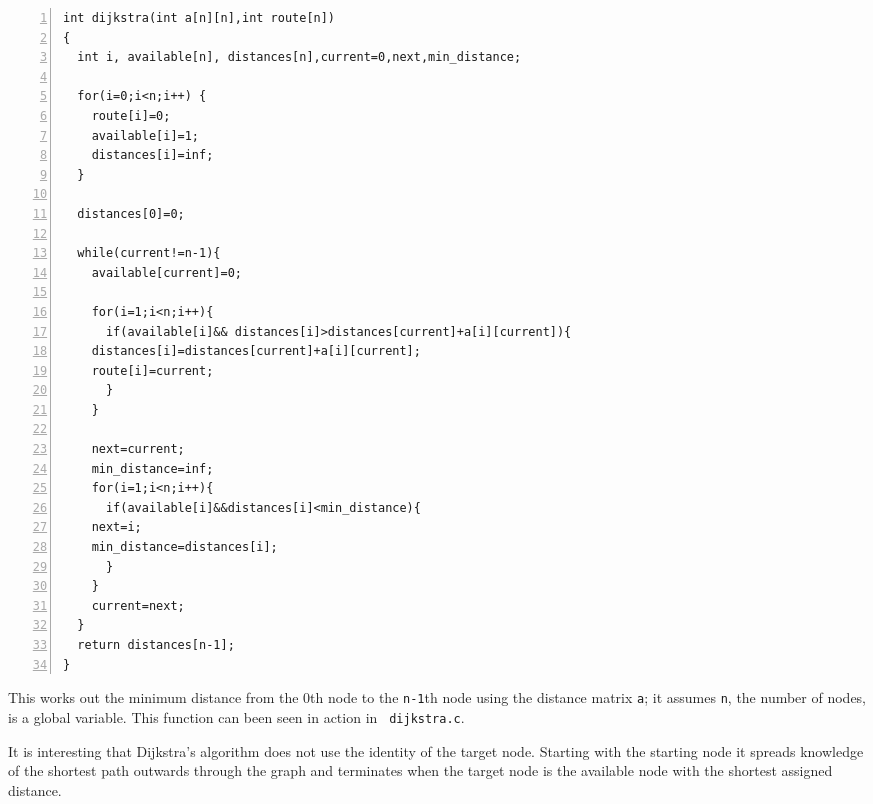 \documentclass[11pt,a4paper]{scrartcl}
\begin{document}
\begin{table}
\begin{lstlisting}[numbers=left]
int dijkstra(int a[n][n],int route[n])
{  
  int i, available[n], distances[n],current=0,next,min_distance;

  for(i=0;i<n;i++) {
    route[i]=0;
    available[i]=1;
    distances[i]=inf;
  }
  
  distances[0]=0;

  while(current!=n-1){
    available[current]=0;

    for(i=1;i<n;i++){
      if(available[i]&& distances[i]>distances[current]+a[i][current]){
	distances[i]=distances[current]+a[i][current];
	route[i]=current;
      }
    }
      
    next=current;
    min_distance=inf;
    for(i=1;i<n;i++){
      if(available[i]&&distances[i]<min_distance){
	next=i;
	min_distance=distances[i];
      }
    }
    current=next;
  }
  return distances[n-1];
} 
\end{lstlisting}
\caption{This works out the minimum distance from the 0th node to the \texttt{n-1}th node using the distance matrix \texttt{a}; it assumes \texttt{n}, the number of nodes, is a global variable. This function can been seen in action in \texttt{
    dijkstra.c}. \label{c_dijkstra}}
\end{table}

It is interesting that Dijkstra's algorithm does not use the identity
of the target node. Starting with the starting node it spreads
knowledge of the shortest path outwards through the graph and
terminates when the target node is the available node with the
shortest assigned distance.
\end{document}

